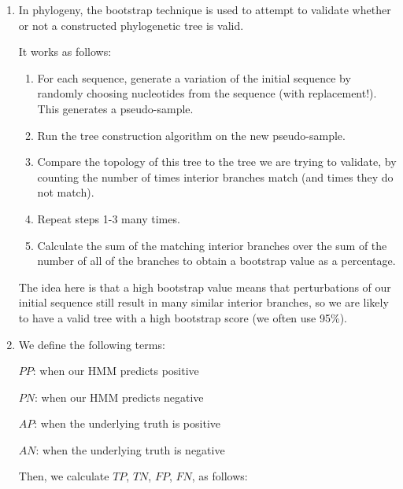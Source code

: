 


\begin{enumerate}[label=(\alph*)]
    
  \item

    In phylogeny, the bootstrap technique is used to attempt to validate whether or not a constructed phylogenetic tree is valid.

    It works as follows: 

    \begin{enumerate}[label=\textbf{\arabic*.}]
        
      \item
    For each sequence, generate a variation of the initial sequence by randomly choosing nucleotides from the sequence (with replacement!). This generates a pseudo-sample.
  \item

    Run the tree construction algorithm on the new pseudo-sample.

  \item
    Compare the topology of this tree to the tree we are trying to validate, by counting the number of times interior branches match (and times they do not match).

  \item
    Repeat steps 1-3 many times.

  \item
    Calculate the sum of the matching interior branches over the sum of the number of all of the branches to obtain a bootstrap value as a percentage.
    \end{enumerate}

    The idea here is that a high bootstrap value means that perturbations of our initial sequence still result in many similar interior branches, so we are likely to have a valid tree with a high bootstrap score (we often use 95\%).

  \item

    We define the following terms:

    $PP$: when our HMM predicts positive

    $PN$: when our HMM predicts negative

    $AP$: when the underlying truth is positive

    $AN$: when the underlying truth is negative

    Then, we calculate $TP$, $TN$, $FP$, $FN$, as follows:


\end{enumerate}
